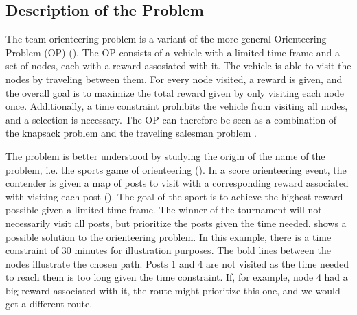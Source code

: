 \subsection{Description of the Problem}

The team orienteering problem is a variant of the more general Orienteering Problem (OP) (\citet{gunawan_orienteering_2016}). The OP consists of a vehicle with a limited time frame and a set of nodes, each with a reward assosiated with it. The vehicle is able to visit the nodes by traveling between them. For every node visited, a reward is given, and the overall goal is to maximize the total reward given by only visiting each node once. Additionally, a time constraint prohibits the vehicle from visiting all nodes, and a selection is necessary. The OP can therefore be seen as a combination of the knapsack problem and the traveling salesman problem \citep{vansteenwegen_orienteering_2011}.

The problem is better understood by studying the origin of the name of the problem, i.e.  the sports game of orienteering (\cite{chao_team_1996}). In a score orienteering event, the contender is given a map of posts to visit with a corresponding reward associated with visiting each post (\cite{tsiligirides_heuristic_1984}). The goal of the sport is to achieve the highest reward possible given a limited time frame. The winner of the tournament will not necessarily visit all posts, but prioritize the posts given the time needed.  shows a possible solution to the orienteering problem. In this example, there is a time constraint of 30 minutes for illustration purposes. The bold lines between the nodes illustrate the chosen path. Posts 1 and 4 are not visited as the time needed to reach them is too long given the time constraint. If, for example, node 4 had a big reward associated with it, the route might prioritize this one, and we would get a different route.

